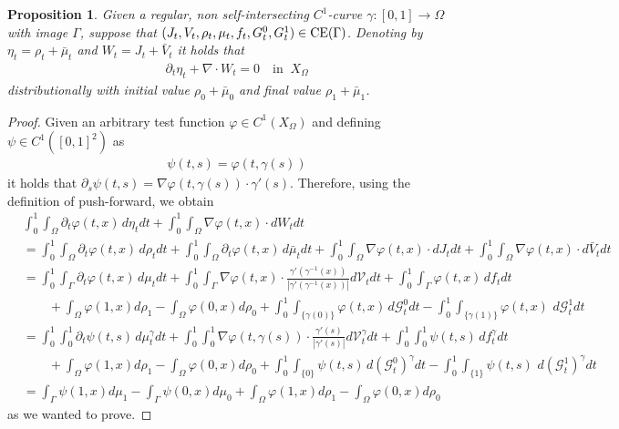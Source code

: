 \documentclass{article}
\newtheorem{proposition}[theorem]{Proposition}
\begin{document}
\begin{proposition}
Given a regular, non self-intersecting $C^1$-curve $\gamma : [0,1] \rightarrow \Omega$ with image $\Gamma$, suppose that $(J_t,V_t,\rho_t,\mu_t,f_t,G^0_t,G^1_t) \in {\rm CE}(\Gamma)$. Denoting by $\eta_t = \rho_t + \bar \mu_t$ and $W_t = J_t + \bar V_t$ it holds that 
    \begin{align}
        \partial_t \eta_t + \nabla \cdot W_t = 0 \quad \text{in } \ X_{\Omega}
    \end{align}
    distributionally with initial value $\rho_0 + \bar \mu_0$ and final value $\rho_1 + \bar \mu_1$.
\end{proposition}   
\begin{proof}
   Given an arbitrary test function $\varphi \in C^1(X_\Omega)$ and defining $\psi \in C^1([0,1]^2)$ as
\begin{align}
    \psi(t,s) = \varphi(t,\gamma(s))
\end{align}
it holds that $\partial_s \psi(t,s) = \nabla \varphi(t,\gamma(s)) \cdot \gamma'(s)$. Therefore, using the definition of push-forward, we obtain 
\begin{align*}
& \int_0^1\int_{\Omega} \partial_t \varphi(t,x)\, d\eta_t dt + \int_0^1\int_{\Omega} \nabla \varphi(t,x)\cdot dW_t dt  \\
& =  \int_0^1\int_{\Omega} \partial_t \varphi(t,x)\, d\rho_t dt +  \int_0^1\int_{\Omega} \partial_t \varphi(t,x)\, d\bar \mu_t dt + \int_0^1\int_{\Omega} \nabla \varphi(t,x) \cdot dJ_t dt +   \int_0^1\int_{\Omega} \nabla \varphi(t,x)\cdot d\bar V_t dt\\
& = \int_0^1\int_{\Gamma} \partial_t \varphi(t,x)\, d\mu_t dt + \int_0^1\int_{\Gamma} \nabla \varphi(t,x) \cdot \frac{\gamma'(\gamma^{-1}(x))}{|\gamma'(\gamma^{-1}(x))|} d \mathcal{V}_t dt+ \int_0^1\int_\Gamma \varphi(t,x)\, df_t dt \\
& \qquad + \int_\Omega \varphi(1,x) d\rho_1 - \int_\Omega \varphi(0,x) d\rho_0 + \int_0^1 \int_{\{\gamma(0)\}} \varphi(t,x)\,d \mathcal{G}_t^0 dt - \int_0^1 \int_{\{\gamma(1)\}} \varphi(t,x)\, \,d \mathcal{G}_t^1 dt\\
& = \int_0^1\int_{0}^1 \partial_t \psi(t,s)\, d \mu_t^\gamma dt + \int_0^1\int_{0}^1 \nabla  \varphi(t,\gamma(s)) \cdot \frac{\gamma'(s)}{|\gamma'(s)|}   d \mathcal{V}^\gamma_t dt + \int_0^1\int_{0}^1 \psi(t,s)\, df_t^\gamma dt \\ &\qquad + \int_\Omega \varphi(1,x) d\rho_1 - \int_\Omega \varphi(0,x) d\rho_0
 +  \int_0^1 \int_{\{0\}} \psi(t,s)\,d (\mathcal{G}_t^0)^\gamma dt - \int_0^1 \int_{\{1\}} \psi(t,s)\, \,d (\mathcal{G}_t^1)^\gamma dt\\
& = \int_\Gamma \psi(1,x) d\mu_1 - \int_\Gamma \psi(0,x) d\mu_0 + \int_\Omega \varphi(1,x) d\rho_1 - \int_\Omega \varphi(0,x) d\rho_0
\end{align*}
as we wanted to prove. 
\end{proof}
\end{document}
